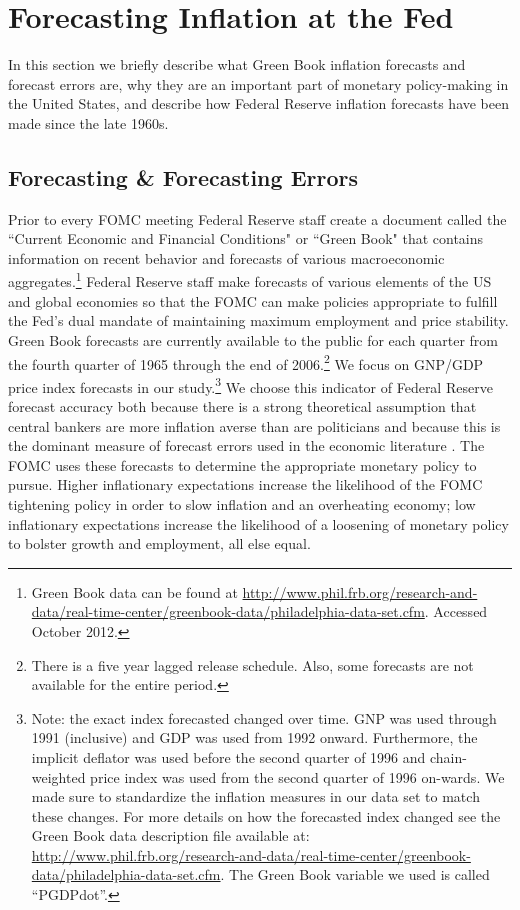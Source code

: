 \documentclass[a4paper]{article}\usepackage{graphicx, color}
\begin{document}

\section{Forecasting Inflation at the Fed}

In this section we briefly describe what Green Book inflation forecasts and forecast errors are, why they are an important part of monetary policy-making in the United States, and describe how Federal Reserve inflation forecasts have been made since the late 1960s.

\subsection{Forecasting \& Forecasting Errors}

Prior to every FOMC meeting Federal Reserve staff create a document called the ``Current Economic and Financial Conditions" or ``Green Book" that contains information on recent behavior and forecasts of various macroeconomic aggregates.\footnote{Green Book data can be found at {\url{http://www.phil.frb.org/research-and-data/real-time-center/greenbook-data/philadelphia-data-set.cfm}}. Accessed October 2012.} Federal Reserve staff make forecasts of various elements of the US and global economies so that the FOMC can make policies appropriate to fulfill the Fed's dual mandate of maintaining maximum employment and price stability. Green Book forecasts are currently available to the public for each quarter from the fourth quarter of 1965 through the end of 2006.\footnote{There is a five year lagged release schedule. Also, some forecasts are not available for the entire period.}  We focus on GNP/GDP price index forecasts in our study.\footnote{Note: the exact index forecasted changed over time. GNP was used through 1991 (inclusive) and GDP was used from 1992 onward. Furthermore, the implicit deflator was used before the second quarter of 1996 and chain-weighted price index was used from the second quarter of 1996 on-wards. We made sure to standardize the inflation measures in our data set to match these changes. For more details on how the forecasted index changed see the Green Book data description file available at: \url{http://www.phil.frb.org/research-and-data/real-time-center/greenbook-data/philadelphia-data-set.cfm}. The Green Book variable we used is called ``PGDPdot''.} We choose this indicator of Federal Reserve forecast accuracy both because there is a strong theoretical assumption that central bankers are more inflation averse than are politicians \citep{Cukierman1992,Mukherjee2008,Tillmann2008} and because this is the dominant measure of forecast errors used in the economic literature \citep[c.f.][]{Romer2000}. The FOMC uses these forecasts to determine the appropriate monetary policy to pursue. Higher inflationary expectations increase the likelihood of the FOMC tightening policy in order to slow inflation and an overheating economy; low inflationary expectations increase the likelihood of a loosening of monetary policy to bolster growth and employment, all else equal.
\end{document}

